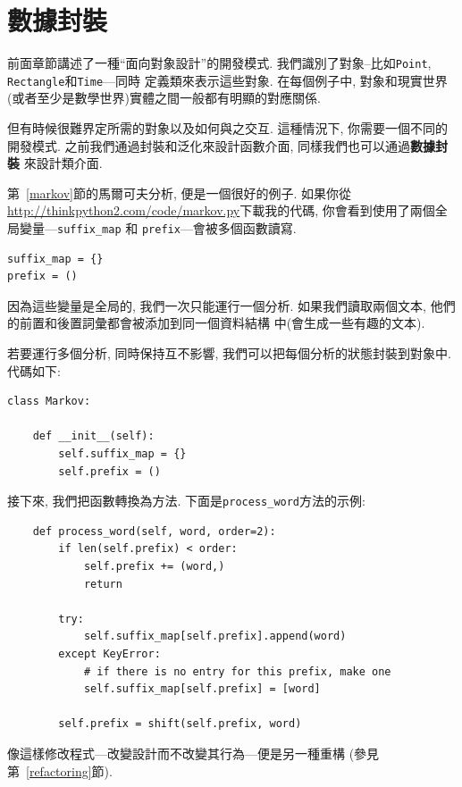 \documentclass[10pt]{book}
\begin{document}
\section{數據封裝}

前面章節講述了一種``面向對象設計''的開發模式. 
我們識別了對象--比如{\tt Point}, {\tt Rectangle}和{\tt Time}---同時
定義類來表示這些對象. 
在每個例子中, 對象和現實世界(或者至少是數學世界)實體之間一般都有明顯的對應關係. 

但有時候很難界定所需的對象以及如何與之交互. 
這種情況下, 你需要一個不同的開發模式. 
之前我們通過封裝和泛化來設計函數介面, 同樣我們也可以通過{\bf 數據封裝}
來設計類介面. 

第~\ref{markov}節的馬爾可夫分析, 便是一個很好的例子. 
如果你從\url{http://thinkpython2.com/code/markov.py}下載我的代碼, 
你會看到使用了兩個全局變量---\verb"suffix_map" 和
\verb"prefix"---會被多個函數讀寫. 

\begin{verbatim}
suffix_map = {}        
prefix = ()            
\end{verbatim}

因為這些變量是全局的, 我們一次只能運行一個分析. 
如果我們讀取兩個文本, 他們的前置和後置詞彙都會被添加到同一個資料結構
中(會生成一些有趣的文本). 

若要運行多個分析, 同時保持互不影響, 我們可以把每個分析的狀態封裝到對象中. 
代碼如下:

\begin{verbatim}
class Markov:

    def __init__(self):
        self.suffix_map = {}
        self.prefix = ()    
\end{verbatim}

接下來, 我們把函數轉換為方法. 
下面是\verb"process_word"方法的示例:

\begin{verbatim}
    def process_word(self, word, order=2):
        if len(self.prefix) < order:
            self.prefix += (word,)
            return

        try:
            self.suffix_map[self.prefix].append(word)
        except KeyError:
            # if there is no entry for this prefix, make one
            self.suffix_map[self.prefix] = [word]

        self.prefix = shift(self.prefix, word)        
\end{verbatim}
像這樣修改程式---改變設計而不改變其行為---便是另一種重構
(參見第~\ref{refactoring}節).
\end{document}
